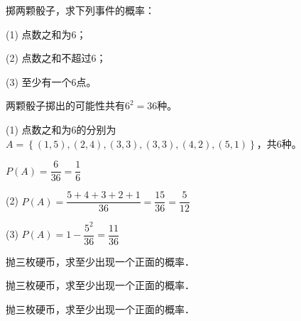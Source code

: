 \documentclass[lang=cn,newtx,10pt,scheme=chinese]{elegantbook}
\begin{document}
\begin{problemset}[习题 1.2]
    \item 掷两颗骰子，求下列事件的概率：
    \item[(1)] 点数之和为6；
    \item[(2)] 点数之和不超过6；
    \item[(3)] 至少有一个6点。
    \begin{solution}
        \begin{framed}
            两颗骰子掷出的可能性共有$6^2=36$种。
            \item[(1)] 点数之和为6的分别为$A=\left\{(1,5),(2,4),(3,3),(3,3),(4,2),(5,1)\right\}$，共6种。\vspace{6pt}
            \item[] $P(A)=\dfrac{6}{36}=\dfrac{1}{6}$\vspace{6pt}
            \item[(2)] $P(A) = \dfrac{5+4+3+2+1}{36}=\dfrac{15}{36}=\dfrac{5}{12}$\vspace{6pt}
            \item[(3)] $P(A) = 1- \dfrac{5^2}{36} = \dfrac{11}{36}$\vspace{6pt}
        \end{framed}
    \end{solution}

    \item 抛三枚硬币，求至少出现一个正面的概率．
    \begin{solution}
        \begin{framed}
            
        \end{framed}
    \end{solution}

    \item 抛三枚硬币，求至少出现一个正面的概率．
    \begin{solution}
        \begin{framed}
            
        \end{framed}
    \end{solution}

    \item 抛三枚硬币，求至少出现一个正面的概率．
    \begin{solution}
        \begin{framed}
            
        \end{framed}
    \end{solution}
\end{problemset}
\end{document}
